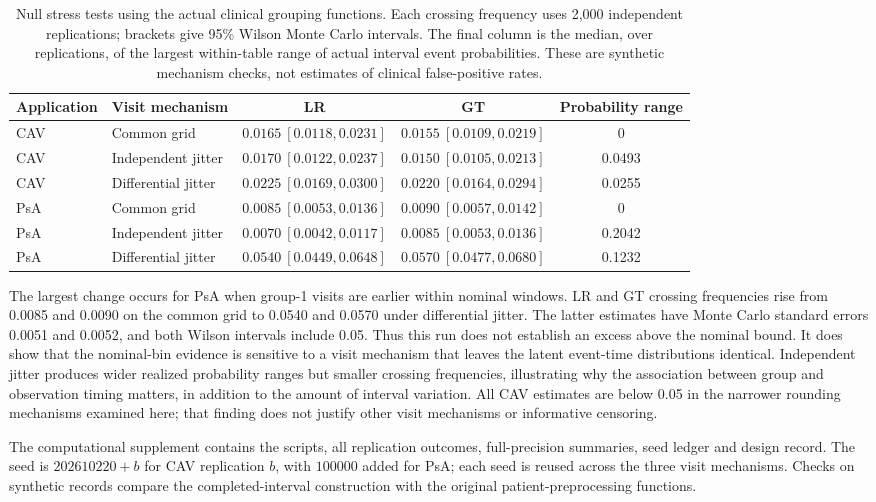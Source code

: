 \documentclass[12pt]{article}
\theoremstyle{definition}
\theoremstyle{remark}
\begin{document}
\begin{table}[H]
\centering
\small
\caption{Null stress tests using the actual clinical grouping functions. Each crossing frequency uses 2,000 independent replications; brackets give 95\% Wilson Monte Carlo intervals. The final column is the median, over replications, of the largest within-table range of actual interval event probabilities. These are synthetic mechanism checks, not estimates of clinical false-positive rates.}
\label{tab:clinical-stress}
\footnotesize
\setlength{\tabcolsep}{3pt}
\begin{tabular}{llccc}
\toprule
Application & Visit mechanism & LR & GT & Probability range\\
\midrule
CAV & Common grid & $0.0165\ [0.0118,0.0231]$ & $0.0155\ [0.0109,0.0219]$ & 0\\
CAV & Independent jitter & $0.0170\ [0.0122,0.0237]$ & $0.0150\ [0.0105,0.0213]$ & 0.0493\\
CAV & Differential jitter & $0.0225\ [0.0169,0.0300]$ & $0.0220\ [0.0164,0.0294]$ & 0.0255\\
PsA & Common grid & $0.0085\ [0.0053,0.0136]$ & $0.0090\ [0.0057,0.0142]$ & 0\\
PsA & Independent jitter & $0.0070\ [0.0042,0.0117]$ & $0.0085\ [0.0053,0.0136]$ & 0.2042\\
PsA & Differential jitter & $0.0540\ [0.0449,0.0648]$ & $0.0570\ [0.0477,0.0680]$ & 0.1232\\
\bottomrule
\end{tabular}
\end{table}

The largest change occurs for PsA when group-1 visits are earlier within nominal windows. LR and GT crossing frequencies rise from 0.0085 and 0.0090 on the common grid to 0.0540 and 0.0570 under differential jitter. The latter estimates have Monte Carlo standard errors 0.0051 and 0.0052, and both Wilson intervals include 0.05. Thus this run does not establish an excess above the nominal bound. It does show that the nominal-bin evidence is sensitive to a visit mechanism that leaves the latent event-time distributions identical. Independent jitter produces wider realized probability ranges but smaller crossing frequencies, illustrating why the association between group and observation timing matters, in addition to the amount of interval variation. All CAV estimates are below 0.05 in the narrower rounding mechanisms examined here; that finding does not justify other visit mechanisms or informative censoring.

The computational supplement contains the scripts, all replication outcomes, full-precision summaries, seed ledger and design record. The seed is $202610220+b$ for CAV replication $b$, with $100000$ added for PsA; each seed is reused across the three visit mechanisms. Checks on synthetic records compare the completed-interval construction with the original patient-preprocessing functions.
\end{document}
